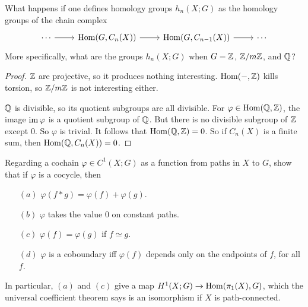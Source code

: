 \begin{exercise}
What happens if one defines homology groups $h_n(X;G)$ as the homology groups
of the chain complex 
\[\begin{tikzcd}
\cdots\ar[r]&\Hom(G,C_n(X))\ar[r]&\Hom(G,C_{n-1}(X))\ar[r]&\cdots
\end{tikzcd}\]
More specifically, what are the groups $h_n(X;G)$ when $G=\mathbb{Z}$, $\mathbb{Z}/m\mathbb{Z}$, and $\mathbb{Q}$?
\end{exercise}
\begin{proof}
$\mathbb{Z}$ are projective, so it produces nothing interesting. $\mathrm{Hom}(-,\mathbb{Z})$ kills torsion, so $\mathbb{Z}/m\mathbb{Z}$ is not interesting either.\par
$\mathbb{Q}$ is divisible, so its quotient subgroups are all divisible. For $\varphi\in\mathrm{Hom}(\mathbb{Q},\mathbb{Z})$, the image $\mathrm{im}\,\varphi$ is a quotient subgroup of $\mathbb{Q}$. But there is no divisible subgroup of $\mathbb{Z}$ except $0$. So $\varphi$ is trivial. It follows that $\mathrm{Hom}(\mathbb{Q},\mathbb{Z})=0$. So if $C_n(X)$ is a finite sum, then $\mathrm{Hom}(\mathbb{Q},C_n(X))=0$.
\end{proof}
\begin{exercise}
Regarding a cochain $\varphi\in C^1(X;G)$ as a function from paths in $X$ to $G$, show that if $\varphi$ is a cocycle, then
\begin{itemize}
\item[$(a)$]$\varphi(f\ast g)=\varphi(f)+\varphi(g)$.
\item[$(b)$]$\varphi$ takes the value $0$ on constant paths.
\item[$(c)$]$\varphi(f)=\varphi(g)$ if $f\simeq g$.
\item[$(d)$]$\varphi$ is a coboundary iff $\varphi(f)$ depends only on the endpoints of $f$, for all $f$.
\end{itemize}
In particular, $(a)$ and $(c)$ give a map $H^1(X;G)\to\mathrm{Hom}(\pi_1(X),G)$, which the universal coefficient theorem says is an isomorphism if $X$ is path-connected.
\end{exercise}
